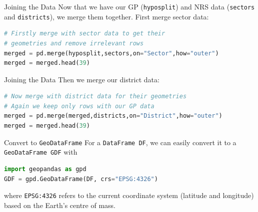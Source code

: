 \documentclass[hyperref={breaklinks,colorlinks,
   urlcolor=blue,citecolor=blue,linkcolor=red}]{beamer}
\begin{document}
\begin{frame}[fragile]{Joining the Data}
Now that we have our GP (\texttt{hyposplit}) and NRS data (\texttt{sectors} and \texttt{districts}), we merge them together.
First merge sector data:
\begin{lstlisting}[language=Python,frame=single]
# Firstly merge with sector data to get their
# geometries and remove irrelevant rows
merged = pd.merge(hyposplit,sectors,on="Sector",how="outer")   
merged = merged.head(39)                                      
\end{lstlisting}
\end{frame}

\begin{frame}[fragile]{Joining the Data}
Then we merge our district data:
\begin{lstlisting}[language=Python,frame=single]
# Now merge with district data for their geometries 
# Again we keep only rows with our GP data
merged = pd.merge(merged,districts,on="District",how="outer")  
merged = merged.head(39)                                       
\end{lstlisting}
\end{frame}

\begin{frame}[fragile]{Convert to \texttt{GeoDataFrame}}
For a \texttt{DataFrame DF}, we can easily convert it to a
\texttt{GeoDataFrame GDF} with
\begin{lstlisting}[language=Python,frame=single]
import geopandas as gpd
GDF = gpd.GeoDataFrame(DF, crs="EPSG:4326")
\end{lstlisting}
where \texttt{EPSG:4326} refers to the current
coordinate system (latitude and longitude) based on the Earth's centre of mass.
\end{frame}
\end{document}
